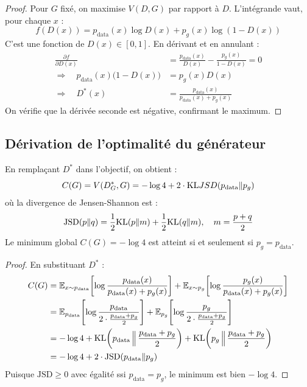 \begin{proof}
Pour $G$ fix\'e, on maximise $V(D, G)$ par rapport \`a $D$. L'int\'egrande vaut, pour chaque $x$ :
\begin{equation}
f(D(x)) = p_{\text{data}}(x) \log D(x) + p_g(x) \log(1 - D(x))
\end{equation}
C'est une fonction de $D(x) \in [0, 1]$. En d\'erivant et en annulant :
\begin{align}
\frac{\partial f}{\partial D(x)} &= \frac{p_{\text{data}}(x)}{D(x)} - \frac{p_g(x)}{1 - D(x)} = 0 \\
\Rightarrow \quad p_{\text{data}}(x)\big(1 - D(x)\big) &= p_g(x) D(x) \\
\Rightarrow \quad D^*(x) &= \frac{p_{\text{data}}(x)}{p_{\text{data}}(x) + p_g(x)}
\end{align}
On v\'erifie que la d\'eriv\'ee seconde est n\'egative, confirmant le maximum.
\end{proof}

\subsection{D\'erivation de l'optimalit\'e du g\'en\'erateur}

\begin{theoreme}
\label{thm:optimal-G}
En rempla\c{c}ant $D^*$ dans l'objectif, on obtient :
\begin{equation}
C(G) = V(D^*_G, G) = -\log 4 + 2 \cdot \mathrm{KL}{JSD}(p_{\text{data}} \| p_g)
\end{equation}
o\`u la divergence de Jensen-Shannon est :
\begin{equation}
\text{JSD}(p \| q) = \frac{1}{2}\mathrm{KL}(p \| m) + \frac{1}{2}\mathrm{KL}(q \| m), \quad m = \frac{p + q}{2}
\end{equation}
Le minimum global $C(G) = -\log 4$ est atteint si et seulement si $p_g = p_{\text{data}}$.
\end{theoreme}

\begin{proof}
En substituant $D^*$ :
\begin{align}
C(G) &= \mathbb{E}_{x \sim p_{\text{data}}}\!\left[\log \frac{p_{\text{data}}(x)}{p_{\text{data}}(x) + p_g(x)}\right] + \mathbb{E}_{x \sim p_g}\!\left[\log \frac{p_g(x)}{p_{\text{data}}(x) + p_g(x)}\right] \\
&= \mathbb{E}_{p_{\text{data}}}\!\left[\log \frac{p_{\text{data}}}{2 \cdot \frac{p_{\text{data}} + p_g}{2}}\right] + \mathbb{E}_{p_g}\!\left[\log \frac{p_g}{2 \cdot \frac{p_{\text{data}} + p_g}{2}}\right] \\
&= -\log 4 + \mathrm{KL}\!\left(p_{\text{data}} \,\Big\|\, \frac{p_{\text{data}} + p_g}{2}\right) + \mathrm{KL}\!\left(p_g \,\Big\|\, \frac{p_{\text{data}} + p_g}{2}\right) \\
&= -\log 4 + 2 \cdot \text{JSD}(p_{\text{data}} \| p_g)
\end{align}
Puisque $\text{JSD} \geq 0$ avec \'egalit\'e ssi $p_{\text{data}} = p_g$, le minimum est bien $-\log 4$.
\end{proof}

